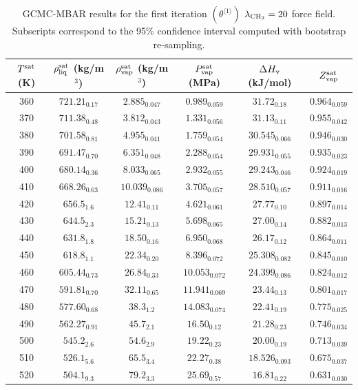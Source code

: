 \documentclass[journal=jctc,manuscript=article]{achemso}
\begin{document}
	\begin{table}[htb!]
		\caption{GCMC-MBAR results for the first iteration $(\theta^{\langle1\rangle})$ $\lambda_{\rm CH_2} = 20$ force field. Subscripts correspond to the 95\% confidence interval computed with bootstrap re-sampling.}
		\begin{center}
			\begin{tabular}{|c|c|c|c|c|c|}
				\hline
				$T^{\rm sat}$ (K) & $\rho_{\rm liq}^{\rm sat}$ (kg/m$^3$) & $\rho_{\rm vap}^{\rm sat}$ (kg/m$^3$) & $P_{\rm vap}^{\rm sat}$ (MPa) & $\Delta H_{\rm v}$ (kJ/mol) & $Z_{\rm vap}^{\rm sat}$ \\ \hline
				360 & $721.21_{0.17}$ & $2.885_{0.047}$ & $0.989_{0.059}$ & $31.72_{0.18}$ & $0.964_{0.059}$ \\
				370 & $711.38_{0.48}$ & $3.812_{0.043}$ & $1.331_{0.056}$ & $31.13_{0.11}$ & $0.955_{0.042}$ \\
				380 & $701.58_{0.81}$ & $4.955_{0.041}$ & $1.759_{0.054}$ & $30.545_{0.066}$ & $0.946_{0.030}$ \\
				390 & $691.47_{0.70}$ & $6.351_{0.048}$ & $2.288_{0.054}$ & $29.931_{0.055}$ & $0.935_{0.023}$ \\
				400 & $680.14_{0.36}$ & $8.033_{0.065}$ & $2.932_{0.055}$ & $29.243_{0.046}$ & $0.924_{0.019}$ \\
				410 & $668.26_{0.63}$ & $10.039_{0.086}$ & $3.705_{0.057}$ & $28.510_{0.057}$ & $0.911_{0.016}$ \\
				420 & $656.5_{1.6}$ & $12.41_{0.11}$ & $4.621_{0.061}$ & $27.77_{0.10}$ & $0.897_{0.014}$ \\
				430 & $644.5_{2.3}$ & $15.21_{0.13}$ & $5.698_{0.065}$ & $27.00_{0.14}$ & $0.882_{0.013}$ \\
				440 & $631.8_{1.8}$ & $18.50_{0.16}$ & $6.950_{0.068}$ & $26.17_{0.12}$ & $0.864_{0.011}$ \\
				450 & $618.8_{1.1}$ & $22.34_{0.20}$ & $8.396_{0.072}$ & $25.308_{0.082}$ & $0.845_{0.010}$ \\
				460 & $605.44_{0.73}$ & $26.84_{0.33}$ & $10.053_{0.072}$ & $24.399_{0.086}$ & $0.824_{0.012}$ \\
				470 & $591.81_{0.70}$ & $32.11_{0.65}$ & $11.941_{0.069}$ & $23.44_{0.13}$ & $0.801_{0.017}$ \\
				480 & $577.60_{0.68}$ & $38.3_{1.2}$ & $14.083_{0.074}$ & $22.41_{0.19}$ & $0.775_{0.025}$ \\
				490 & $562.27_{0.91}$ & $45.7_{2.1}$ & $16.50_{0.12}$ & $21.28_{0.23}$ & $0.746_{0.034}$ \\
				500 & $545.2_{2.6}$ & $54.6_{2.9}$ & $19.22_{0.23}$ & $20.00_{0.19}$ & $0.713_{0.039}$ \\
				510 & $526.1_{5.6}$ & $65.5_{3.4}$ & $22.27_{0.38}$ & $18.526_{0.093}$ & $0.675_{0.037}$ \\
				520 & $504.1_{9.3}$ & $79.2_{3.3}$ & $25.69_{0.57}$ & $16.81_{0.22}$ & $0.631_{0.030}$ \\
				\hline
			\end{tabular}
		\end{center}
	\end{table}
\end{document}
